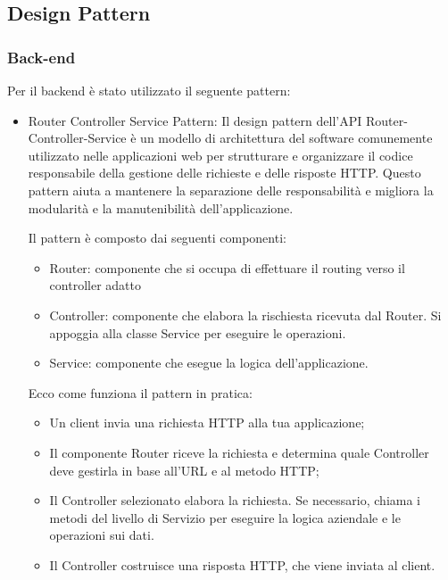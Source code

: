 \documentclass[12pt]{article}
\begin{document}
\subsection{Design Pattern}
\subsubsection{Back-end}
Per il backend è stato utilizzato il seguente pattern:
	\begin{itemize}
		\item Router Controller Service Pattern:
			Il design pattern dell'API Router-Controller-Service è un modello di architettura del software comunemente utilizzato nelle applicazioni web per strutturare e organizzare il codice responsabile della gestione delle richieste e delle risposte HTTP. Questo pattern aiuta a mantenere la separazione delle responsabilità e migliora la modularità e la manutenibilità dell'applicazione.

			Il pattern è composto dai seguenti componenti:
			\begin{itemize}
				\item Router: componente che si occupa di effettuare il routing verso il controller adatto
				\item Controller: componente che elabora la rischiesta ricevuta dal Router. Si appoggia alla classe Service per eseguire le operazioni.
				\item Service: componente che esegue la logica dell'applicazione.
			\end{itemize}
			Ecco come funziona il pattern in pratica:
			\begin{itemize}
				\item Un client invia una richiesta HTTP alla tua applicazione;
				\item Il componente Router riceve la richiesta e determina quale Controller deve gestirla in base all'URL e al metodo HTTP;
				\item Il Controller selezionato elabora la richiesta. Se necessario, chiama i metodi del livello di Servizio per eseguire la logica aziendale e le operazioni sui dati.
				\item Il Controller costruisce una risposta HTTP, che viene inviata al client.
			\end{itemize}		
	\end{itemize}
\end{document}
